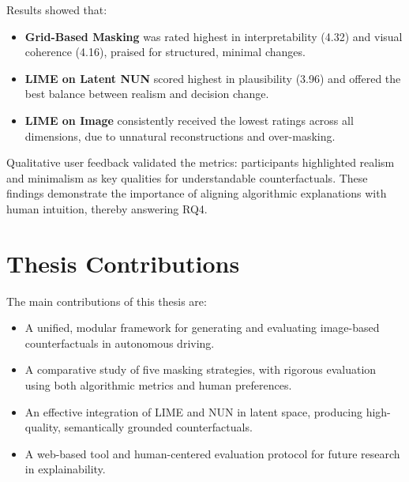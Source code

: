 Results showed that:

\begin{itemize}
    \item \textbf{Grid-Based Masking} was rated highest in interpretability (4.32) and visual coherence (4.16), praised for structured, minimal changes.
    \item \textbf{LIME on Latent NUN} scored highest in plausibility (3.96) and offered the best balance between realism and decision change.
    \item \textbf{LIME on Image} consistently received the lowest ratings across all dimensions, due to unnatural reconstructions and over-masking.
\end{itemize}

Qualitative user feedback validated the metrics: participants highlighted realism and minimalism as key qualities for understandable counterfactuals. These findings demonstrate the importance of aligning algorithmic explanations with human intuition, thereby answering RQ4.

\section{Thesis Contributions}

The main contributions of this thesis are:
\begin{itemize}
    \item A unified, modular framework for generating and evaluating image-based counterfactuals in autonomous driving.
    \item A comparative study of five masking strategies, with rigorous evaluation using both algorithmic metrics and human preferences.
    \item An effective integration of LIME and NUN in latent space, producing high-quality, semantically grounded counterfactuals.
    \item A web-based tool and human-centered evaluation protocol for future research in explainability.
\end{itemize}


